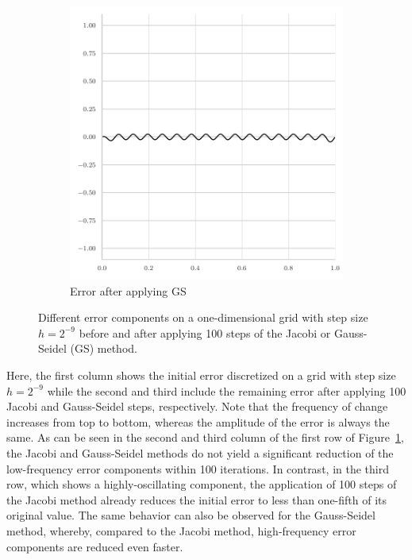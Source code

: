 \begin{figure}
\begin{subfigure}[t]{0.32\textwidth}
		\includegraphics[width=\textwidth]{figures/error_plots//final_error_gauss_seidel_32pi.pdf}
	\caption{Error after applying GS}
	\end{subfigure}
	\caption{Different error components on a one-dimensional grid with step size $h = 2^{-9}$ before and after applying 100 steps of the Jacobi or Gauss-Seidel (GS) method.}
	\label{fig:different-error-components}
\end{figure}
Here, the first column shows the initial error discretized on a grid with step size $h = 2^{-9}$ while the second and third include the remaining error after applying 100 Jacobi and Gauss-Seidel steps, respectively.
Note that the frequency of change increases from top to bottom, whereas the amplitude of the error is always the same.
As can be seen in the second and third column of the first row of Figure~\ref{fig:different-error-components}, the Jacobi and Gauss-Seidel methods do not yield a significant reduction of the low-frequency error components within 100 iterations.
In contrast, in the third row, which shows a highly-oscillating component, the application of 100 steps of the Jacobi method already reduces the initial error to less than one-fifth of its original value.
The same behavior can also be observed for the Gauss-Seidel method, whereby, compared to the Jacobi method, high-frequency error components are reduced even faster.
